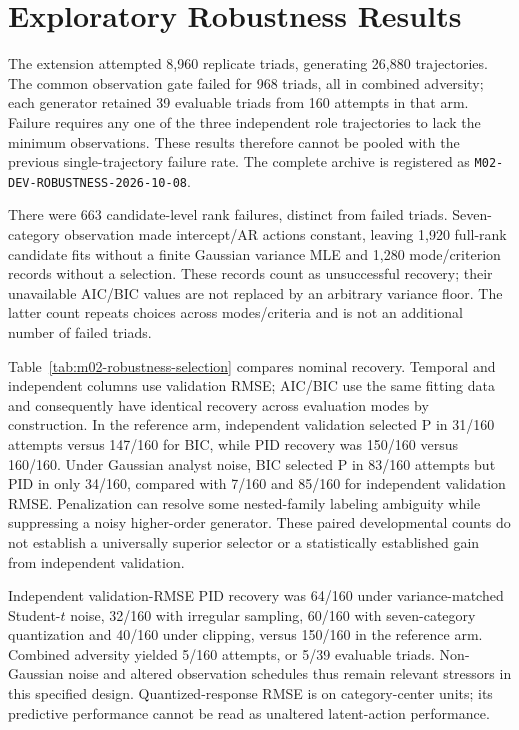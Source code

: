 \section{Exploratory Robustness Results}

The extension attempted 8,960 replicate triads, generating 26,880 trajectories. The common observation gate failed for 968 triads, all in combined adversity; each generator retained 39 evaluable triads from 160 attempts in that arm. Failure requires any one of the three independent role trajectories to lack the minimum observations. These results therefore cannot be pooled with the previous single-trajectory failure rate. The complete archive is registered as \texttt{M02-DEV-ROBUSTNESS-2026-10-08}.

There were 663 candidate-level rank failures, distinct from failed triads. Seven-category observation made intercept/AR actions constant, leaving 1,920 full-rank candidate fits without a finite Gaussian variance MLE and 1,280 mode/criterion records without a selection. These records count as unsuccessful recovery; their unavailable AIC/BIC values are not replaced by an arbitrary variance floor. The latter count repeats choices across modes/criteria and is not an additional number of failed triads.



Table~\ref{tab:m02-robustness-selection} compares nominal recovery. Temporal and independent columns use validation RMSE; AIC/BIC use the same fitting data and consequently have identical recovery across evaluation modes by construction. In the reference arm, independent validation selected P in 31/160 attempts versus 147/160 for BIC, while PID recovery was 150/160 versus 160/160. Under Gaussian analyst noise, BIC selected P in 83/160 attempts but PID in only 34/160, compared with 7/160 and 85/160 for independent validation RMSE. Penalization can resolve some nested-family labeling ambiguity while suppressing a noisy higher-order generator. These paired developmental counts do not establish a universally superior selector or a statistically established gain from independent validation.

Independent validation-RMSE PID recovery was 64/160 under variance-matched Student-$t$ noise, 32/160 with irregular sampling, 60/160 with seven-category quantization and 40/160 under clipping, versus 150/160 in the reference arm. Combined adversity yielded 5/160 attempts, or 5/39 evaluable triads. Non-Gaussian noise and altered observation schedules thus remain relevant stressors in this specified design. Quantized-response RMSE is on category-center units; its predictive performance cannot be read as unaltered latent-action performance.

